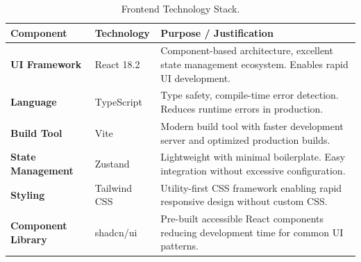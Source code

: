 \documentclass[12pt,a4paper]{report}
\begin{document}
\begin{table}[H]
\centering
\caption{Frontend Technology Stack.}
\label{tab:frontend_stack}
\small
\begin{tabular}{>{\raggedright\arraybackslash}p{3cm} >{\raggedright\arraybackslash}p{3.5cm} >{\raggedright\arraybackslash}p{7.5cm}}
\toprule
\textbf{Component} & \textbf{Technology} & \textbf{Purpose / Justification} \\
\midrule
\textbf{UI Framework} & React 18.2 & Component-based architecture, excellent state management ecosystem. Enables rapid UI development. \\
\midrule
\textbf{Language} & TypeScript & Type safety, compile-time error detection. Reduces runtime errors in production. \\
\midrule
\textbf{Build Tool} & Vite & Modern build tool with faster development server and optimized production builds. \\
\midrule
\textbf{State Management} & Zustand & Lightweight with minimal boilerplate. Easy integration without excessive configuration. \\
\midrule
\textbf{Styling} & Tailwind CSS & Utility-first CSS framework enabling rapid responsive design without custom CSS. \\
\midrule
\textbf{Component Library} & shadcn/ui & Pre-built accessible React components reducing development time for common UI patterns. \\
\bottomrule
\end{tabular}
\end{table}
\end{document}

